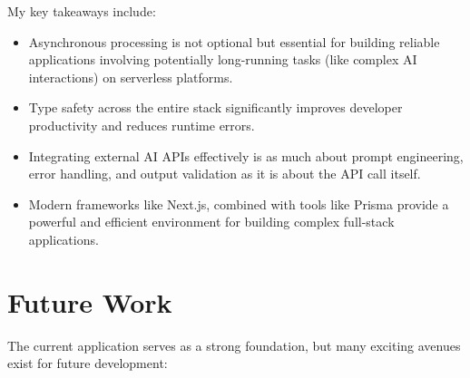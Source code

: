 \documentclass[
	letterpaper,
	11pt
]{jdf}
\begin{document}
My key takeaways include:
\begin{itemize}[noitemsep]
    \item Asynchronous processing is not optional but essential for building reliable applications involving potentially long-running tasks (like complex AI interactions) on serverless platforms.
    \item Type safety across the entire stack significantly improves developer productivity and reduces runtime errors.
    \item Integrating external AI APIs effectively is as much about prompt engineering, error handling, and output validation as it is about the API call itself.
    \item Modern frameworks like Next.js, combined with tools like Prisma provide a powerful and efficient environment for building complex full-stack applications.
\end{itemize}

\section{Future Work}

The current application serves as a strong foundation, but many exciting avenues exist for future development:
\end{document}
